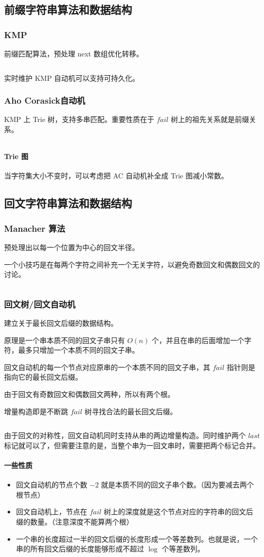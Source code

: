 \documentclass[UTF-8]{ctexart}
\newcommand{\cpp}[1]{\inputminted[bgcolor=bg,breaklines,breakanywhere=true]{c++}{#1}}
\begin{document}
		\subsection{前缀字符串算法和数据结构}
			\subsubsection{KMP}
			前缀匹配算法，预处理 next 数组优化转移。
			\cpp{code//String//kmp.cpp}
			实时维护 KMP 自动机可以支持可持久化。
			\subsubsection{Aho Corasick自动机}
			KMP 上 Trie 树，支持多串匹配。重要性质在于 $fail$ 树上的祖先关系就是前缀关系。
			\cpp{code//String//aho.cpp}
			\paragraph{Trie 图} 当字符集大小不变时，可以考虑把 AC 自动机补全成 Trie 图减小常数。
		\subsection{回文字符串算法和数据结构}
			\subsubsection{Manacher 算法}
			预处理出以每一个位置为中心的回文半径。
			
			一个小技巧是在每两个字符之间补充一个无关字符，以避免奇数回文和偶数回文的讨论。
			\cpp{code//String//manacher.cpp}
			\subsubsection{回文树/回文自动机}
			建立关于最长回文后缀的数据结构。
			
			原理是一个串本质不同的回文子串只有 $O(n)$ 个，并且在串的后面增加一个字符，最多只增加一个本质不同的回文子串。
			
			回文自动机的每一个节点对应原串的一个本质不同的回文子串，其 $fail$ 指针则是指向它的最长回文后缀。
			
			由于回文有奇数回文和偶数回文两种，所以有两个根。
			
			增量构造即是不断跳 $fail$ 树寻找合法的最长回文后缀。
			\cpp{code//String//pam.cpp}
			由于回文的对称性，回文自动机同时支持从串的两边增量构造。同时维护两个 $last$ 标记就可以了，但需要注意的是，当整个串为一回文串时，需要把两个标记合并。
			\paragraph{一些性质}
			\begin{itemize}
				\item 回文自动机的节点个数 $-2$ 就是本质不同的回文子串个数。（因为要减去两个根节点）
				\item 回文自动机上，节点在 $fail$ 树上的深度就是这个节点对应的字符串的回文后缀的数量。（注意深度不能算两个根）
				\item 一个串的长度超过一半的回文后缀的长度形成一个等差数列。也就是说，一个串的所有回文后缀的长度能够形成不超过 $\log$ 个等差数列。
			\end{itemize}
\end{document}
